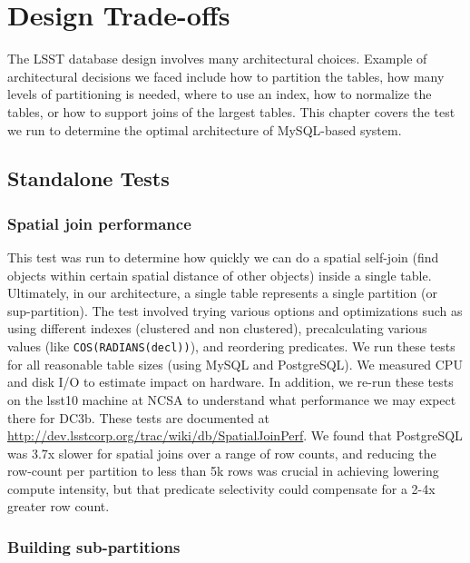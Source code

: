 \documentclass[DM,lsstdraft,toc]{lsstdoc}
\begin{document}
\section{Design Trade-offs}\label{design-trade-offs}

The LSST database design involves many architectural choices. Example of
architectural decisions we faced include how to partition the tables,
how many levels of partitioning is needed, where to use an index, how to
normalize the tables, or how to support joins of the largest tables.
This chapter covers the test we run to determine the optimal
architecture of MySQL-based system.

\subsection{Standalone Tests}\label{standalone-tests}

\subsubsection{Spatial join performance}\label{spatial-join-performance}

This test was run to determine how quickly we can do a spatial self-join
(find objects within certain spatial distance of other objects) inside a
single table. Ultimately, in our architecture, a single table represents
a single partition (or sup-partition). The test involved trying various
options and optimizations such as using different indexes (clustered and
non clustered), precalculating various values (like
\texttt{COS(RADIANS(decl))}), and reordering predicates. We run these
tests for all reasonable table sizes (using MySQL and PostgreSQL). We
measured CPU and disk I/O to estimate impact on hardware. In addition,
we re-run these tests on the lsst10 machine at NCSA to understand what
performance we may expect there for DC3b. These tests are documented at
\url{http://dev.lsstcorp.org/trac/wiki/db/SpatialJoinPerf}. We found
that PostgreSQL was 3.7x slower for spatial joins over a range of row
counts, and reducing the row-count per partition to less than 5k rows
was crucial in achieving lowering compute intensity, but that predicate
selectivity could compensate for a 2-4x greater row count.

\subsubsection{Building sub-partitions}\label{building-sub-partitions}
\end{document}
